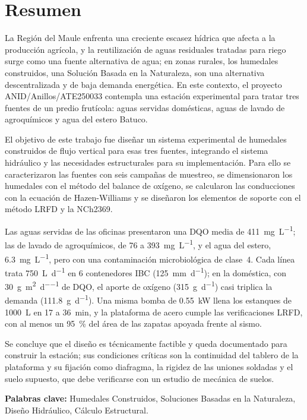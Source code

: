 \chapter*{Resumen}
\label{pag:resumen-ini}


La Región del Maule enfrenta una creciente escasez hídrica que afecta a la producción agrícola, y la reutilización de aguas residuales tratadas para riego surge como una fuente alternativa de agua; en zonas rurales, los humedales construidos, una Solución Basada en la Naturaleza, son una alternativa descentralizada y de baja demanda energética.
En este contexto, el proyecto ANID/Anillos/ATE250033 contempla una estación experimental para tratar tres fuentes de un predio frutícola: aguas servidas domésticas, aguas de lavado de agroquímicos y agua del estero Batuco.

El objetivo de este trabajo fue diseñar un sistema experimental de humedales construidos de flujo vertical para esas tres fuentes, integrando el sistema hidráulico y las necesidades estructurales para su implementación.
Para ello se caracterizaron las fuentes con seis campañas de muestreo, se dimensionaron los humedales con el método del balance de oxígeno, se calcularon las conducciones con la ecuación de Hazen-Williams y se diseñaron los elementos de soporte con el método LRFD y la NCh2369.

Las aguas servidas de las oficinas presentaron una DQO media de \qty{411}{\milli\gram\per\liter}; las de lavado de agroquímicos, de 76 a \qty{393}{\milli\gram\per\liter}, y el agua del estero, \qty{6.3}{\milli\gram\per\liter}, pero con una contaminación microbiológica de clase~4.
Cada línea trata \qty{750}{\liter\per\day} en 6 contenedores IBC (\qty{125}{\milli\meter\per\day}); en la doméstica, con \qty{30}{\gram\per\square\meter\per\day} de DQO, el aporte de oxígeno (\qty{315}{\gram\per\day}) casi triplica la demanda (\qty{111.8}{\gram\per\day}).
Una misma bomba de \qty{0.55}{\kilo\watt} llena los estanques de \qty{1000}{\liter} en 17 a \qty{36}{\minute}, y la plataforma de acero cumple las verificaciones LRFD, con al menos un \qty{95}{\percent} del área de las zapatas apoyada frente al sismo.

Se concluye que el diseño es técnicamente factible y queda documentado para construir la estación; sus condiciones críticas son la continuidad del tablero de la plataforma y su fijación como diafragma, la rigidez de las uniones soldadas y el suelo supuesto, que debe verificarse con un estudio de mecánica de suelos.

\noindent\textbf{Palabras clave:} Humedales Construidos, Soluciones Basadas en la Naturaleza, Diseño Hidráulico, Cálculo Estructural.
\label{pag:resumen-fin}
